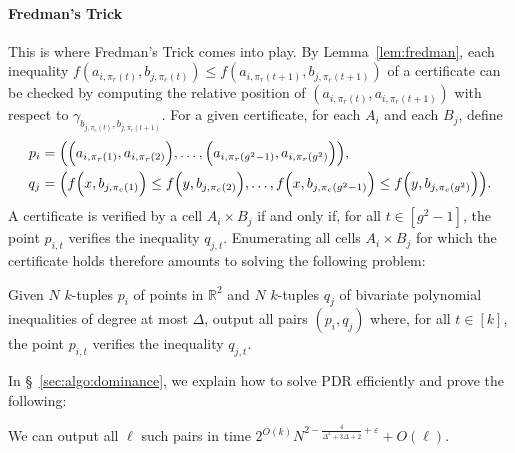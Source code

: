\paragraph{Fredman's Trick}
This is where Fredman's Trick comes into play.
By Lemma~\ref{lem:fredman}, each inequality
$f(a_{i,\pi_r(t)},b_{j,\pi_c(t)}) \le f(a_{i,\pi_r(t+1)},b_{j,\pi_c(t+1)})$
of a certificate can be checked
by computing the relative position of $(a_{i,\pi_r(t)},a_{i,\pi_r(t+1)})$ with
respect to $\gamma_{b_{j,\pi_c(t)},b_{j,\pi_c(t+1)}}$.
For a given certificate, for each $A_i$ and each $B_j$, define
%
\begin{align*}
p_i &= \mleft(
    \Big(a_{i,\pi_r(1)},a_{i,\pi_r(2)}\Big),
    \ldots,
    \Big(a_{i,\pi_r(g^2-1)},a_{i,\pi_r(g^2)}\Big)
\mright),\\
q_j &= \mleft(
    f\Big(x,b_{j,\pi_c(1)}\Big) \le f\Big(y,b_{j,\pi_c(2)}\Big),
    \ldots,
    f\Big(x,b_{j,\pi_c(g^2-1)}\Big) \le f\Big(y,b_{j,\pi_c(g^2)}\Big)
\mright).
\end{align*}
%
A certificate is verified by a cell $A_i \times B_j$ if and only if, for all
$t \in [g^2-1]$, the point $p_{i,t}$ verifies the inequality $q_{j,t}$.
Enumerating all cells $A_i\times B_j$ for which the
certificate holds therefore amounts to solving the following problem:
%
\begin{problem}
Given $N$ $k$-tuples $p_i$ of points in $\mathbb{R}^2$ and $N$ $k$-tuples $q_j$
of bivariate polynomial inequalities of degree at most $\Delta$,
output all pairs $(p_i,q_j)$ where, for all $t \in [k]$,
the point $p_{i,t}$ verifies the inequality $q_{j,t}$.
\end{problem}
%
In \S~\ref{sec:algo:dominance}, we explain how to solve PDR efficiently
and prove the following:
\begin{lemma}\label{lem:dominance}
    We can output
    all $\ell$ such pairs in time
    $2^{O(k)} N^{2-\frac{4}{\Delta^2+3\Delta+2}+\varepsilon} + O(\ell)$.
\end{lemma}


